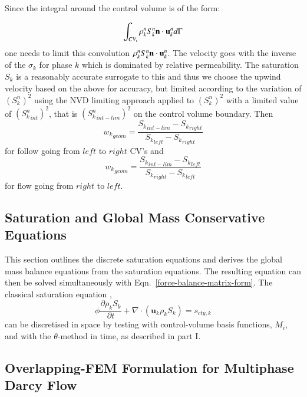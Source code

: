 \documentclass[preprint,authoryear,12pt]{elsarticle}
\begin{document}
{Since the integral around the control volume is of the form:

\begin{equation}
\int_{CV_i} \rho_k^n S_k^n {\bf n} \cdot{\bf u}_k^n  d\Gamma
\end{equation}
one needs to limit this convolution $\rho_k^n S_k^n {\bf n} \cdot{\bf u}_k^n$. 
The velocity goes with the inverse of the $\sigma_k$ for phase $k$ 
which is dominated by relative permeability. The saturation $S_k$ 
is a reasonably accurate surrogate to this and thus we choose 
the upwind velocity based on the above for accuracy, but 
limited according to the variation of $(S_k^n)^2$ using the NVD 
limiting approach applied to $(S_k^n)^2$ with a limited  
value of  $({S_k^n}_{int})^2$, that is  $({S_k^n}_{int-lim})^2$ on the control volume boundary. Then 
\begin{equation}
{w_k}_{geom} = \frac{ {S_k}_{int-lim} - {S_k}_{right} }
{ {S_k}_{left} - {S_k}_{right} }
\end{equation}
for follow going from $left$ to $right$ CV's and 
\begin{equation}
{w_k}_{geom} = \frac{ {S_k}_{int-lim} - {S_k}_{left} }
{ {S_k}_{right} - {S_k}_{left} }
\end{equation}
for flow going from $right$ to $left$. 




\subsection{Saturation and Global Mass Conservative Equations}
This section outlines the discrete saturation equations and derives
the global mass balance equations from the saturation equations. The
resulting equation can then be solved simultaneously with
Eqn.~\ref{force-balance-matrix-form}. The classical saturation
equation \citep{chavent_1986},
\begin{equation}
  \phi\displaystyle\frac{\partial \rho_{k} S_{k} }{\partial t}  + \nabla \cdot \left( {\mathbf u}_{k} \rho_{k} S_{k}\right) = s_{cty,k} 
\end{equation}
can be discretised in space by testing with control-volume basis functions, $M_{i}$, and with the $\theta$-method in time, as described in part I. 
\subsection{Overlapping-FEM Formulation for Multiphase Darcy Flow} \label{overlapping_method_section}

}
\end{document}

